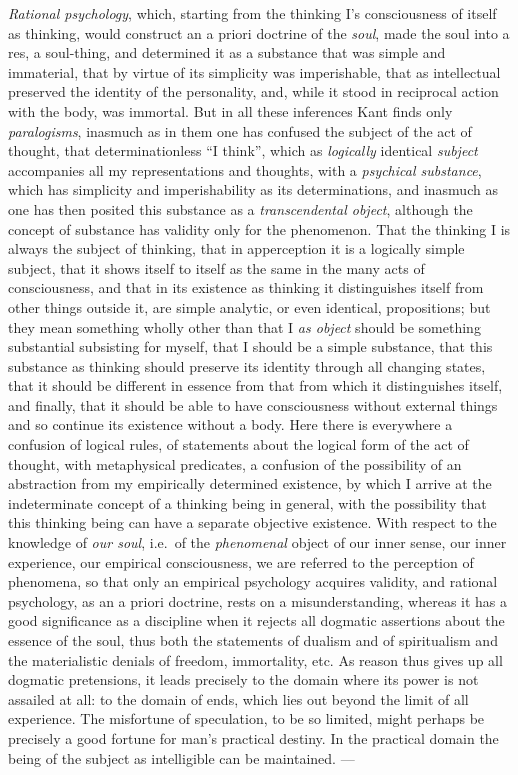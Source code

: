 \emph{Rational psychology}, which, starting from the thinking I's
consciousness of itself as thinking, would construct an a priori doctrine
of the \emph{soul}, made the soul into a res, a soul-thing, and determined
it as a substance that was simple and immaterial, that by virtue of its
simplicity was imperishable, that as intellectual preserved the identity
of the personality, and, while it stood in reciprocal action with the
body, was immortal. But in all these inferences Kant finds only
\emph{paralogisms}, inasmuch as in them one has confused the subject of
the act of thought, that determinationless ``I think'', which as
\emph{logically} identical \emph{subject} accompanies all my
representations and thoughts, with a \emph{psychical substance}, which has
simplicity and imperishability as its determinations, and inasmuch as one
has then posited this substance as a \emph{transcendental object},
although the concept of substance has validity only for the phenomenon.
That the thinking I is always the subject of thinking, that in
apperception it is a logically simple subject, that it shows itself to
itself as the same in the many acts of consciousness, and that in its
existence as thinking it distinguishes itself from other things outside
it, are simple analytic, or even identical, propositions; but they mean
something wholly other than that I \emph{as object} should be something
substantial subsisting for myself, that I should be a simple substance,
that this substance as thinking should preserve its identity through all
changing states, that it should be different in essence from that from
which it distinguishes itself, and finally, that it should be able to
have consciousness without external things and so continue its existence
without a body. Here there is everywhere a confusion of logical rules, of
statements about the logical form of the act of thought, with
metaphysical predicates, a confusion of the possibility of an abstraction
from my empirically determined existence, by which I arrive at the
indeterminate concept of a thinking being in general, with the
possibility that this thinking being can have a separate objective
existence. With respect to the knowledge of \emph{our soul}, i.e.\ of the
\emph{phenomenal} object of our inner sense, our inner experience, our
empirical consciousness, we are referred to the perception of phenomena,
so that only an empirical psychology acquires validity, and rational
psychology, as an a priori doctrine, rests on a misunderstanding, whereas
it has a good significance as a discipline when it rejects all dogmatic
assertions about the essence of the soul, thus both the statements of
dualism and of spiritualism and the materialistic denials of freedom,
immortality, etc. As reason thus gives up all dogmatic pretensions, it
leads precisely to the domain where its power is not assailed at all: to
the domain of ends, which lies out beyond the limit of all experience. The
misfortune of speculation, to be so limited, might perhaps be precisely a
good fortune for man's practical destiny. In the practical domain the
being of the subject as intelligible can be maintained. ---


